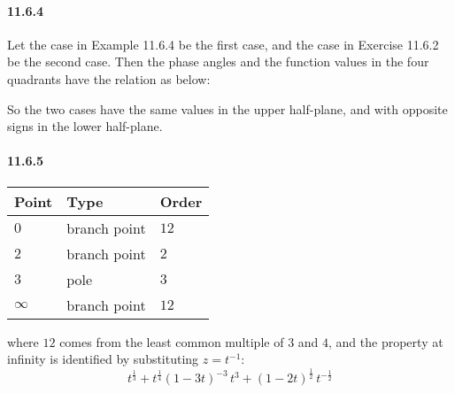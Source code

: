 \documentclass[a4paper]{article}
\begin{document}
\paragraph{11.6.4}
Let the case in Example 11.6.4 be the first case, and the case in Exercise 11.6.2 be the second case. Then the phase angles and the function values in the four quadrants have the relation as below:
\begin{center}
\end{center}
So the two cases have the same values in the upper half-plane, and with opposite signs in the lower half-plane.

\paragraph{11.6.5}
\begin{center}
    \begin{tabular}{>{\centering\arraybackslash}p{1.5cm} >{\centering\arraybackslash}p{2cm} >{\centering\arraybackslash}p{1.5cm}}
    \hline
    Point & Type & Order \\
    \hline
    $0$ & branch point & $12$ \\
    $2$ & branch point & $2$ \\
    $3$ & pole & $3$  \\
    $\infty$ & branch point & $12$ 
    \end{tabular}
\end{center}
where $12$ comes from the least common multiple of $3$ and $4$, and the property at infinity is identified by substituting $z=t^{-1}$:
\[
t^{\frac{1}{3}}+t^{\frac{1}{4}}(1-3t)^{-3}\,t^{3}+(1-2t)^{\frac{1}{2}}\,t^{-\frac{1}{2}}
\]
\end{document}

